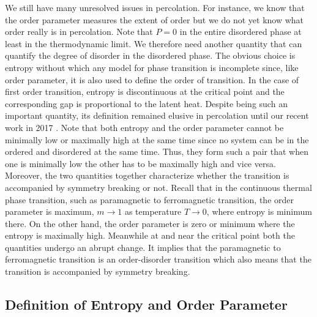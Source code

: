 	We still have many unresolved issues in percolation.  For instance, we know that the
	order parameter measures the extent of order but we do not yet 
	know what order really is in percolation. Note that $P=0$
	in the entire disordered phase at least in the thermodynamic limit. We therefore need another
	quantity that can quantify the degree of disorder in the disordered phase. 
	The obvious choice is entropy without which
	any model for phase transition is incomplete since, like order parameter, it is also used to define
	the order of transition. In the case of first order transition, entropy is discontinuous
	at the critical point and the corresponding gap is proportional to the latent heat.
	Despite being such an important quantity, its definition remained elusive in percolation until our 
	recent work in 2017 \cite{Hassan2017, Sabbir2018}.
	Note that both entropy and the order
	parameter cannot be minimally low or maximally high at the same time since no system 
	can be in the ordered and disordered at the same time. Thus, they form such a pair that 
	when one is minimally low the other has to be maximally
	high and vice versa. Moreover, the two quantities together characterize whether the transition 
	is accompanied by symmetry breaking or not. 
	Recall that in the continuous thermal phase transition, such as paramagnetic to 
	ferromagnetic transition, the order parameter is maximum, $m\rightarrow 1$ 
	as temperature $T\rightarrow 0$, where entropy is minimum there. On the other hand, the order parameter 
	is zero or minimum where the entropy is maximally high. Meanwhile at and near the critical 
	point both the quantities undergo an abrupt change. It implies that the paramagnetic
	to ferromagnetic transition is an order-disorder transition which also means that the transition
	is accompanied by symmetry breaking.
	
	
	\subsection{Definition of Entropy and Order Parameter}
	
